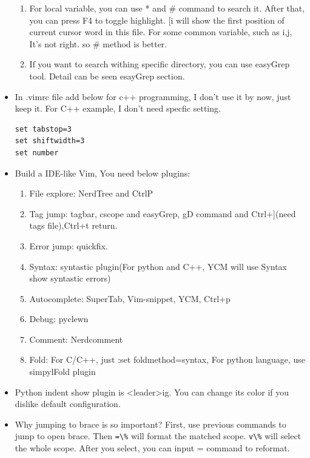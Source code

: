 \documentclass[a4paper,12pt,twoside]{book}
\begin{document}
\begin{itemize}
\begin{enumerate}
		\item For local variable, you can use * and \# command to search it. After that, you can press F4 to toggle highlight. $[$i will show the first position of current cursor word in this file. For some common variable, such as i,j, It's not right. so \# method is better.

		\item If you want to search withing specific directory, you can use easyGrep tool. Detail can be seen esayGrep section.
\end{enumerate}

	\item In .vimrc file add below for c++ programming, I don't use it by now, just keep it. For C++ example, I don't need specfic setting.  
\begin{verbatim} 
set tabstop=3
set shiftwidth=3
set number	
\end{verbatim}

\item Build a IDE-like Vim, You need below plugins:
		\begin{enumerate}
				\item File explore: NerdTree and CtrlP

				\item Tag jump: tagbar, cscope and easyGrep, gD command and Ctrl+](need tags file),Ctrl+t return.

				\item Error jump: quickfix.

				\item Syntax: syntastic plugin(For python and C++, YCM will use Syntax show syntastic errors)
				\item Autocomplete: SuperTab, Vim-snippet, YCM, Ctrl+p

				\item Debug: pyclewn

				\item Comment: Nerdcomment

				\item Fold: For C/C++, just :set foldmethod=syntax, For python language, use simpylFold plugin 
		\end{enumerate}
		
		\item Python indent show plugin is <leader>ig. You can change its color if you dislike default configuration. 				
				
		\item Why jumping to brace is so important? First, use previous commands to jump to open brace. Then \verb!=\%! will format the matched scope. \verb=v\%= will select the whole scope.  After you select, you can input = command to reformat. 
		

\end{itemize}
\end{document}
